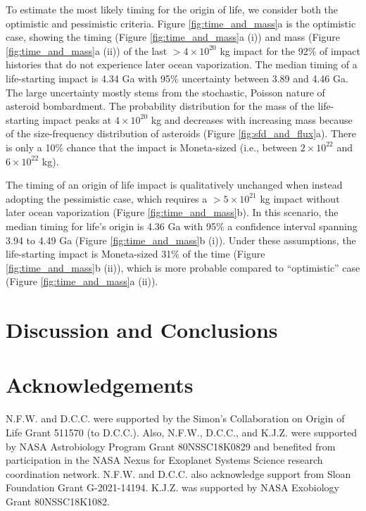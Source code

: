 \documentclass[preprint]{aastex63}
\begin{document}
To estimate the most likely timing for the origin of life, we consider both the \citet{Wogan_2023} optimistic and pessimistic criteria. Figure \ref{fig:time_and_mass}a is the optimistic case, showing the timing (Figure \ref{fig:time_and_mass}a (i)) and mass (Figure \ref{fig:time_and_mass}a (ii)) of the last $> 4 \times 10^{20}$ kg impact for the 92\% of impact histories that do not experience later ocean vaporization. The median timing of a life-starting impact is 4.34 Ga with 95\% uncertainty between 3.89 and 4.46 Ga. The large uncertainty mostly stems from the stochastic, Poisson nature of asteroid bombardment. The probability distribution for the mass of the life-starting impact peaks at $4 \times 10^{20}$ kg and decreases with increasing mass because of the size-frequency distribution of asteroids (Figure \ref{fig:sfd_and_flux}a). There is only a 10\% chance that the impact is Moneta-sized (i.e., between $2 \times 10^{22}$ and $6 \times 10^{22}$ kg).

The timing of an origin of life impact is qualitatively unchanged when instead adopting the \citet{Wogan_2023} pessimistic case, which requires a $> 5 \times 10^{21}$ kg impact without later ocean vaporization (Figure \ref{fig:time_and_mass}b). In this scenario, the median timing for life's origin is 4.36 Ga with 95\% a confidence interval spanning 3.94 to 4.49 Ga (Figure \ref{fig:time_and_mass}b (i)). Under these assumptions, the life-starting impact is Moneta-sized 31\% of the time (Figure \ref{fig:time_and_mass}b (ii)), which is more probable compared to ``optimistic'' case (Figure \ref{fig:time_and_mass}a (ii)).

\section{Discussion and Conclusions}

\section*{Acknowledgements}

N.F.W. and D.C.C. were supported by the Simon's Collaboration on Origin of Life Grant 511570 (to D.C.C.). Also, N.F.W., D.C.C., and K.J.Z. were supported by NASA Astrobiology Program Grant 80NSSC18K0829 and benefited from participation in the NASA Nexus for Exoplanet Systems Science research coordination network. N.F.W. and D.C.C. also acknowledge support from Sloan Foundation Grant G-2021-14194. K.J.Z. was supported by NASA Exobiology Grant 80NSSC18K1082.
\end{document}
